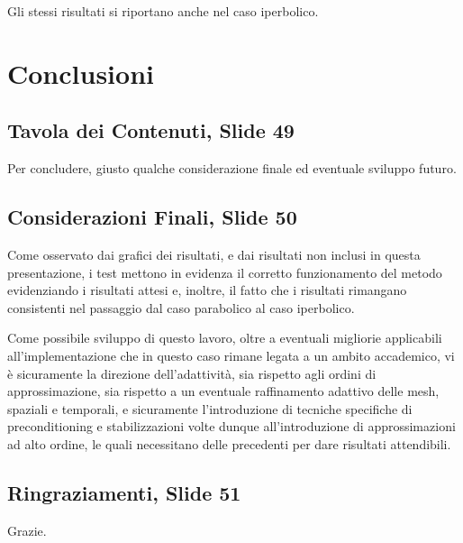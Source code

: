 \documentclass[12pt]{article}
\begin{document}
    Gli stessi risultati si riportano anche nel caso iperbolico.

    \newpage
    \section{Conclusioni}

    \subsection{Tavola dei Contenuti, Slide 49}

    Per concludere, giusto qualche considerazione finale ed eventuale sviluppo futuro.

    \subsection{Considerazioni Finali, Slide 50}

    Come osservato dai grafici dei risultati, e dai risultati non inclusi in questa presentazione, i test mettono in evidenza il corretto funzionamento del metodo evidenziando i risultati attesi e, inoltre, il fatto che i risultati rimangano consistenti nel passaggio dal caso parabolico al caso iperbolico.

    Come possibile sviluppo di questo lavoro, oltre a eventuali migliorie applicabili all'implementazione che in questo caso rimane legata a un ambito accademico, vi è sicuramente la direzione dell'adattività, sia rispetto agli ordini di approssimazione, sia rispetto a un eventuale raffinamento adattivo delle mesh, spaziali e temporali, e sicuramente l'introduzione di tecniche specifiche di preconditioning e stabilizzazioni volte dunque all'introduzione di approssimazioni ad alto ordine, le quali necessitano delle precedenti per dare risultati attendibili.

    \subsection{Ringraziamenti, Slide 51}

    Grazie.
\end{document}
